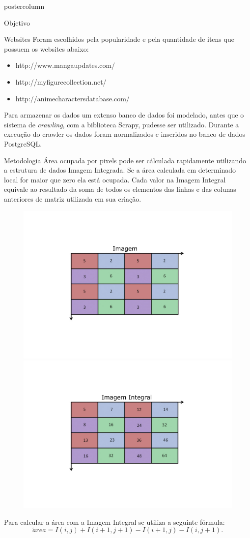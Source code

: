 \documentclass[final,hyperref={pdfpagelabels=false}]{beamer}
\begin{document}
\begin{frame}
\begin{columns}
\begin{column}{.49\textwidth}
\begin{beamercolorbox}[center,wd=\textwidth]{postercolumn}
\begin{minipage}[T]{.95\textwidth}
{\begin{block}{Objetivo}
            \end{block}
        	\vfill   
            \begin{block}{Websites}
           Foram escolhidos pela popularidade e pela quantidade de itens que possuem os websites abaixo:
			\begin{itemize}
			\item http://www.mangaupdates.com/
			\item http://myfigurecollection.net/
			\item http://animecharactersdatabase.com/
			\end{itemize}
			
			Para armazenar os dados um extenso banco de dados foi modelado, antes que o sistema de \emph{crawling}, com a biblioteca Scrapy, pudesse ser utilizado. Durante a execução do crawler os dados foram normalizados e inseridos no banco de dados PostgreSQL. 
            \end{block}
            \vfill 
            \begin{block}{Metodologia}
			Área ocupada por pixels pode ser cálculada rapidamente utilizando a estrutura de dados Imagem Integrada. Se a área calculada em determinado local for maior que zero ela está ocupada.
			Cada valor na Imagem Integral equivale ao resultado da soma de todos os elementos das linhas e das colunas anteriores de matriz utilizada em sua criação.
			\begin{figure}[H]
			\includegraphics[width=0.35\linewidth]{image.pdf}
			\includegraphics[width=0.35\linewidth]{integral.pdf} 
			\end{figure}
            Para calcular a área com a Imagem Integral se utiliza a seguinte fórmula:
            \begin{equation} 
            \acute{a}rea = I(i,j) + I(i + 1,j + 1) - I(i + 1,j) - I(i,j + 1).
            \end{equation}
            

\end{block}}
\end{minipage}
\end{beamercolorbox}
\end{column}
\end{columns}
\end{frame}
\end{document}
